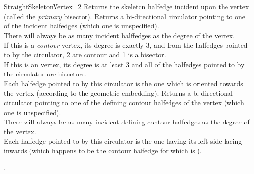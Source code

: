 \begin{ccRefConcept}{StraightSkeletonVertex_2}
\ccAccessFunctions
  \ccGlue
  \ccGlue
  \ccGlue
  \ccGlue
{Returns the skeleton halfedge incident upon the vertex (called the \textit{primary} bisector).}
  \ccGlue
  \ccGlue
{Returns a bi-directional circulator pointing to one of the incident halfedges (which one is unspecified).\\
There will always be as many incident halffedges as the degree of the vertex.\\
If this is a \textit{contour} vertex, its degree is exactly 3, and from the halfedges pointed to by the circulator, 2 are contour and 1 is a bisector.\\
If this is an  vertex, its degree is at least 3 and all of the halfedges pointed to by the circulator are bisectors.\\
Each halfedge pointed to by this circulator is the one which is oriented towards the vertex (according to the geometric embedding).}
  \ccGlue
  \ccGlue
{Returns a bi-directional circulator pointing to one of the defining contour halfedges of the vertex (which one is unspecified).\\
There will always be as many incident defining contour halfedges as the degree of the vertex.\\
Each halfedge pointed to by this circulator is the one having its left side facing inwards (which happens to be the contour halfedge for which  is ).}


\ccGlue
{}

\ccHasModels

.

\ccSeeAlso

\\
\\
\\
\\

\end{ccRefConcept}

